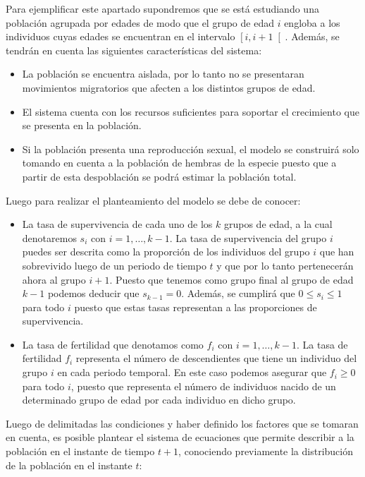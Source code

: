Para ejemplificar este apartado supondremos que se está estudiando una población agrupada por edades de modo que el grupo de edad $i$ engloba a los individuos cuyas edades se encuentran en el intervalo $\left[i,i+1\right[$. Además, se tendrán en cuenta las siguientes características del sistema:

\begin{itemize}
    \item La población se encuentra aislada, por lo tanto no se presentaran movimientos migratorios que afecten a los distintos grupos de edad.
    \item El sistema cuenta con los recursos suficientes para soportar el crecimiento que se presenta en la población.
    \item Si la población presenta una reproducción sexual, el modelo se construirá solo tomando en cuenta a la población de hembras de la especie puesto que a partir de esta despoblación se podrá estimar la población total.
\end{itemize}

Luego para realizar el planteamiento del modelo se debe de conocer:

\begin{itemize}
    \item La tasa de supervivencia de cada uno de los $k$ grupos de edad, a la cual denotaremos $s_i$ con $i=1,\dots,k-1$. La tasa de supervivencia del grupo $i$ puedes ser descrita como la proporción de los individuos del grupo $i$ que han sobrevivido luego de un periodo de tiempo $t$ y que por lo tanto pertenecerán ahora al grupo $i+1$. Puesto que tenemos como grupo final al grupo de edad $k-1$ podemos deducir que $s_{k-1} = 0$. Además, se cumplirá que $0 \leq s_i \leq 1$ para todo $i$ puesto que estas tasas representan a las proporciones de supervivencia.

    \item La tasa de fertilidad que denotamos como $f_i$ con $i = 1,\dots,k-1$. La tasa de fertilidad $f_i$ representa el número de descendientes que tiene un individuo del grupo $i$ en cada periodo temporal. En este caso podemos asegurar que $f_i \geq 0$ para todo $i$, puesto que representa el número de individuos nacido de un determinado grupo de edad por cada individuo en dicho grupo.
\end{itemize}

Luego de delimitadas las condiciones y haber definido los factores que se tomaran en cuenta, es posible plantear el sistema de ecuaciones que permite describir a la población en el instante de tiempo $t+1$, conociendo previamente la distribución de la población en el instante $t$:

